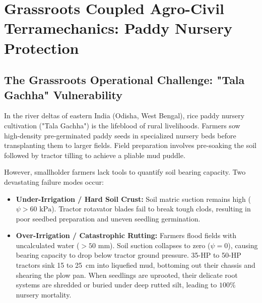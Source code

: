 \documentclass[11pt,a4paper]{article}
\theoremstyle{definition}
\theoremstyle{remark}
\begin{document}
\section{Grassroots Coupled Agro-Civil Terramechanics: Paddy Nursery Protection}

\subsection{The Grassroots Operational Challenge: "Tala Gachha" Vulnerability}
In the river deltas of eastern India (Odisha, West Bengal), rice paddy nursery cultivation ("Tala Gachha") is the lifeblood of rural livelihoods. Farmers sow high-density pre-germinated paddy seeds in specialized nursery beds before transplanting them to larger fields. Field preparation involves pre-soaking the soil followed by tractor tilling to achieve a pliable mud puddle.

However, smallholder farmers lack tools to quantify soil bearing capacity. Two devastating failure modes occur:
\begin{itemize}
    \item \textbf{Under-Irrigation / Hard Soil Crust:} Soil matric suction remains high ($\psi > 60\text{ kPa}$). Tractor rotavator blades fail to break tough clods, resulting in poor seedbed preparation and uneven seedling germination.
    \item \textbf{Over-Irrigation / Catastrophic Rutting:} Farmers flood fields with uncalculated water ($> 50\text{ mm}$). Soil suction collapses to zero ($\psi = 0$), causing bearing capacity to drop below tractor ground pressure. 35-HP to 50-HP tractors sink 15 to 25~cm into liquefied mud, bottoming out their chassis and shearing the plow pan. When seedlings are uprooted, their delicate root systems are shredded or buried under deep rutted silt, leading to $100\%$ nursery mortality.
\end{itemize}
\end{document}
